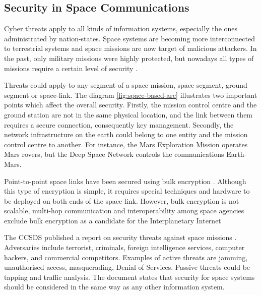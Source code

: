 \subsection{Security in Space Communications}


Cyber threats apply to all kinds of information systems, especially the ones administrated by nation-states. Space systems are becoming more interconnected to terrestrial systems and space missions are now target of malicious attackers.  In the past, only military missions were highly protected, but nowadays all types of missions require a certain level of security \cite{book2006security}.

Threats could apply to any segment of a space mission, space segment, ground segment or space-link. The diagram \ref{fig:space-based-arc} illustrates two important points which affect the overall security.  Firstly, the mission control centre and the ground station are not in the same physical location, and the link between them requires a secure connection, consequently key management. Secondly, the network infrastructure on the earth could belong to one entity and the mission control centre to another.  For instance, the  Mars Exploration Mission operates Mars rovers, but the Deep Space Network controls the communications Earth-Mars.

Point-to-point space links have been secured using bulk encryption \cite{book2011space}. Although this type of encryption is simple, it requires special techniques and hardware to be deployed on both ends of the space-link. However, bulk encryption is not scalable, multi-hop communication and interoperability among space agencies exclude bulk encryption as a candidate for the Interplanetary Internet %

The CCSDS published a report on security threats against space missions \cite{book2006security}. Adversaries include terrorist, criminals, foreign intelligence services, computer hackers, and commercial competitors.  Examples of active threats are jamming, unauthorised access, masquerading, Denial of Services. Passive threats could be tapping and traffic analysis.  The document states that security for space systems should be considered in the same way as any other information system.

 


